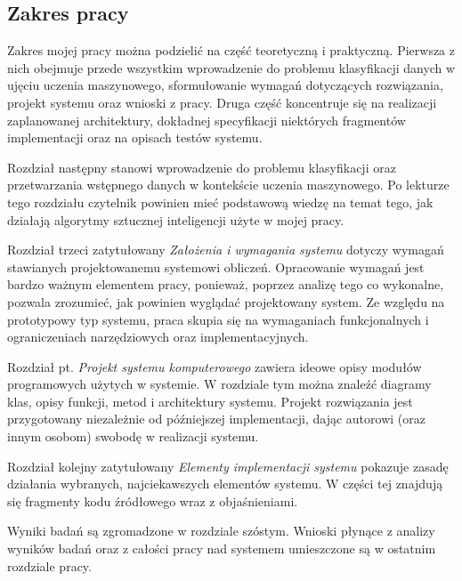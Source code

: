 \documentclass[../thesis.tex]{subfiles}
\begin{document}
\subsection{Zakres pracy}

Zakres mojej pracy można podzielić na część teoretyczną i praktyczną. Pierwsza z nich obejmuje przede wszystkim wprowadzenie do problemu klasyfikacji danych w ujęciu uczenia maszynowego, sformułowanie wymagań dotyczących rozwiązania, projekt systemu oraz wnioski z pracy. Druga część koncentruje się na realizacji zaplanowanej architektury, dokładnej specyfikacji niektórych fragmentów implementacji oraz na opisach testów systemu. 

Rozdział następny stanowi wprowadzenie do problemu klasyfikacji oraz przetwarzania wstępnego danych w kontekście uczenia maszynowego. Po lekturze tego rozdziału czytelnik powinien mieć podstawową wiedzę na temat tego, jak działają algorytmy sztucznej inteligencji użyte w mojej pracy.

Rozdział trzeci zatytułowany \emph{Założenia i wymagania systemu} dotyczy wymagań stawianych projektowanemu systemowi obliczeń. Opracowanie wymagań jest bardzo ważnym elementem pracy, ponieważ, poprzez analizę tego co wykonalne, pozwala zrozumieć, jak powinien wyglądać projektowany system. Ze względu na prototypowy typ systemu, praca skupia się na wymaganiach funkcjonalnych i ograniczeniach narzędziowych oraz implementacyjnych.

Rozdział pt. \emph{Projekt systemu komputerowego} zawiera ideowe opisy modułów programowych użytych w systemie. W rozdziale tym można znaleźć diagramy klas, opisy funkcji, metod i architektury systemu. Projekt rozwiązania jest przygotowany niezależnie od późniejszej implementacji, dając autorowi (oraz innym osobom) swobodę w realizacji systemu.

Rozdział kolejny zatytułowany \emph{Elementy implementacji systemu} pokazuje zasadę działania wybranych, najciekawszych elementów systemu. W części tej znajdują się fragmenty kodu źródłowego wraz z objaśnieniami.

Wyniki badań są zgromadzone w rozdziale szóstym. Wnioski płynące z analizy wyników badań oraz z całości pracy nad systemem umieszczone są w ostatnim rozdziale pracy.
\end{document}
